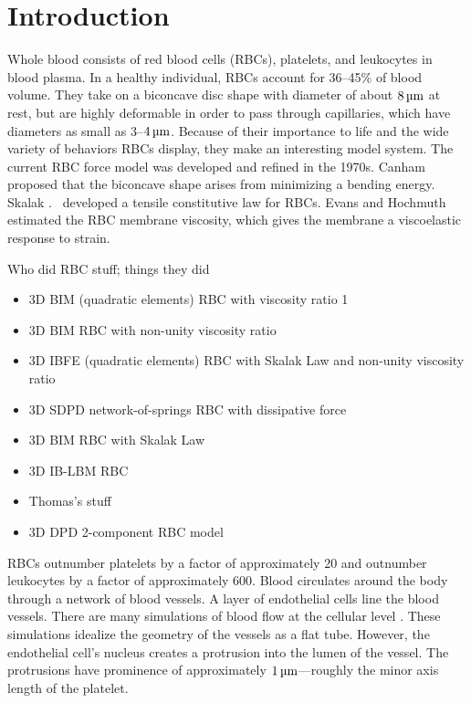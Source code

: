 \section{Introduction}

Whole blood consists of red blood cells (RBCs), platelets, and leukocytes in blood
plasma. In a healthy individual, RBCs account for 36--45\% of blood volume. They take on
a biconcave disc shape with diameter of about $8\um$ at rest, but are highly deformable
in order to pass through capillaries, which have diameters as small as $3$--$4\um$.
Because of their importance to life and the wide variety of behaviors RBCs display, they
make an interesting model system. The current RBC force model was developed and refined
in the 1970s. Canham~\cite{Canham:1970wx} proposed that the biconcave shape arises from
minimizing a bending energy. Skalak .~\cite{Skalak:1973tp} developed a
tensile constitutive law for RBCs. Evans and Hochmuth~\cite{Evans:1976tx} estimated the
RBC membrane viscosity, which gives the membrane a viscoelastic response to strain.

\noindent Who did RBC stuff; things they did
\begin{itemize}[noitemsep, topsep=0pt]
    \item 3D BIM (quadratic elements) RBC with viscosity ratio 1~\cite{Pozrikidis:1998tx}
    \item 3D BIM RBC with non-unity viscosity ratio~\cite{Pozrikidis:2003ft}
    \item 3D IBFE (quadratic elements) RBC with Skalak Law and non-unity viscosity ratio~\cite{Le:2010im}
    \item 3D SDPD network-of-springs RBC with dissipative force~\cite{Fedosov:2010bc}
    \item 3D BIM RBC with Skalak Law~\cite{Omori:2012hw}
    \item 3D IB-LBM RBC~\cite{Xu:2013kk}
    \item Thomas's stuff~\cite{Fai:2013do}
    \item 3D DPD 2-component RBC model~\cite{Li:2014hva}
\end{itemize}

RBCs
outnumber platelets by a factor of approximately 20 and outnumber leukocytes by a factor
of approximately 600. Blood circulates around the body through a network of blood
vessels. A layer of endothelial cells line the blood vessels. {\XXX} There are many
simulations of blood flow at the cellular level {\XXX}. These simulations idealize the
geometry of the vessels as a flat tube. However, the endothelial cell's nucleus creates a
protrusion into the lumen of the vessel. The protrusions have prominence of approximately
$1\um$---roughly the minor axis length of the platelet.

